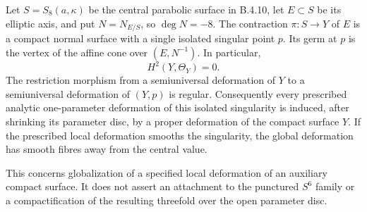 \begin{proposition}
Let $S=S_8(a,\kappa)$ be the central parabolic surface in B.4.10,
let $E\subset S$ be its elliptic axis, and put
$N=N_{E/S}$, so $\deg N=-8$.
The contraction $\pi:S\to Y$ of $E$ is a compact normal surface
with a single isolated singular point $p$.
Its germ at $p$ is the vertex of the affine cone over
$(E,N^{-1})$.  In particular,
\[
 H^2(Y,\Theta_Y)=0.
\]
The restriction morphism from a semiuniversal deformation of $Y$
to a semiuniversal deformation of $(Y,p)$ is regular.
Consequently every prescribed analytic one-parameter deformation
of this isolated singularity is induced, after shrinking its
parameter disc, by a proper deformation of the compact surface $Y$.
If the prescribed local deformation smooths the singularity, the
global deformation has smooth fibres away from the central value.

This concerns globalization of a specified local deformation of
an auxiliary compact surface.  It does not assert an attachment to
the punctured $S^6$ family or a compactification of the resulting
threefold over the open parameter disc.
\end{proposition}
